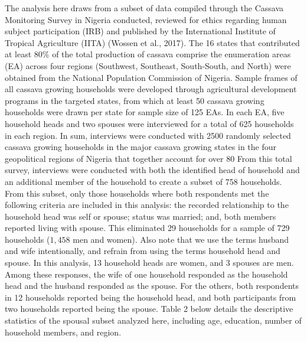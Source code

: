 \documentclass[12pt]{article}
\begin{document}
	The analysis here draws from a subset of data compiled through the Cassava Monitoring Survey in Nigeria conducted, reviewed for ethics regarding human subject participation (IRB) and published by the International Institute of Tropical Agriculture (IITA) (Wossen et al., 2017). The 16 states that contributed at least 80\% of the total production of cassava comprise the enumeration areas (EA) across four regions (Southwest, Southeast, South-South, and North) were obtained from the National Population Commission of Nigeria. Sample frames of all cassava growing households were developed through agricultural development programs in the targeted states, from which at least 50 cassava growing households were drawn per state for sample size of 125 EAs. In each EA, five household heads and two spouses were interviewed for a total of 625 households in each region. In sum, interviews were conducted with 2500 randomly selected cassava growing households in the major cassava growing states in the four geopolitical regions of Nigeria that together account for over 80%
	From this total survey, interviews were conducted with both the identified head of household and an additional member of the household to create a subset of 758 households. From this subset, only those households where both respondents met the following criteria are included in this analysis: the recorded relationship to the household head was self or spouse; status was married; and, both members reported living with spouse. This eliminated 29 households for a sample of 729 households ($1,458$ men and women). Also note that we use the terms husband and wife intentionally, and refrain from using the terms household head and spouse. In this analysis, 13 household heads are women, and 3 spouses are men. Among these responses, the wife of one household responded as the household head and the husband responded as the spouse. For the others, both respondents in 12 households reported being the household head, and both participants from two households reported being the spouse. Table 2 below details the descriptive statistics of the spousal subset analyzed here, including age, education, number of household members, and region. 
	
\end{document}
